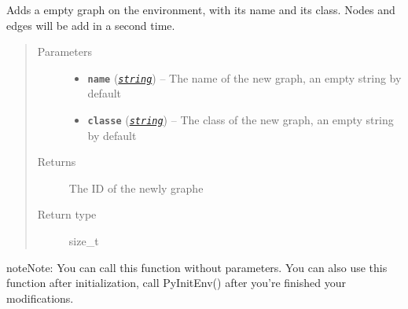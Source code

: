 \documentclass[letterpaper,10pt,english]{sphinxmanual}
\begin{document}
\begin{fulllineitems}
\label{doc:PythonGedLib.PyAddGraph}
Adds a empty graph on the environment, with its name and its class. Nodes and edges will be add in a second time.
\begin{quote}\begin{description}
\item[{Parameters}] \leavevmode\begin{itemize}
\item {} 
\textbf{\texttt{name}} (\href{https://docs.python.org/3/library/string.html\#module-string}{\emph{\texttt{string}}}) -- The name of the new graph, an empty string by default

\item {} 
\textbf{\texttt{classe}} (\href{https://docs.python.org/3/library/string.html\#module-string}{\emph{\texttt{string}}}) -- The class of the new graph, an empty string by default

\end{itemize}

\item[{Returns}] \leavevmode
The ID of the newly graphe

\item[{Return type}] \leavevmode
size\_t

\end{description}\end{quote}

\begin{notice}{note}{Note:}
You can call this function without parameters. You can also use this function after initialization, call PyInitEnv() after you're finished your modifications.
\end{notice}

\end{fulllineitems}

\end{document}
